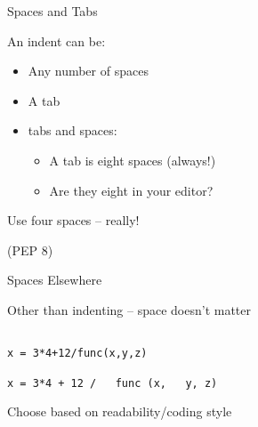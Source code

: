 \documentclass{beamer}
\begin{document}
\begin{frame}[fragile]{Spaces and Tabs}

{\Large  An indent can be:}
\begin{itemize}
  \item Any number of spaces
  \item A tab
  \item tabs and spaces:
    \begin{itemize}
      \item A tab is eight spaces (always!)
      \item Are they eight in your editor?
    \end{itemize}
\end{itemize}

\vfill
{\LARGE Use four spaces -- really!}

\vfill
(PEP 8)

\end{frame}


\begin{frame}[fragile]{Spaces Elsewhere}

{\Large  Other than indenting -- space doesn't matter}

\vfill
\begin{verbatim}

x = 3*4+12/func(x,y,z)

x = 3*4 + 12 /   func (x,   y, z) 

\end{verbatim}

\vfill
{\Large Choose based on readability/coding style}

\vfill
{}

\end{frame}
\end{document}

